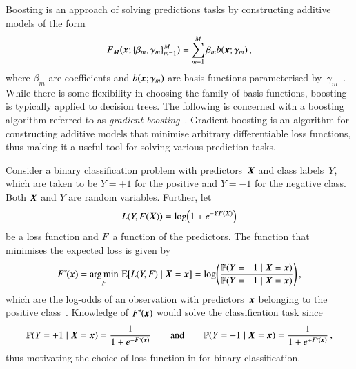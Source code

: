 Boosting is an approach of solving predictions tasks by constructing additive
models of the form
\begin{align*}
  F_{M}\bigl(\myvec{x}; \{ \beta_m, \gamma_{m} \}_{m=1}^{M} \bigr) = \sum_{m = 1}^{M} \beta_m b(\myvec{x}; \gamma_{m}) \,\text{,}
\end{align*}
where $\beta_m$ are coefficients and $b(\myvec{x}; \gamma_{m})$ are basis
functions parameterised
by~$\gamma_{m}$~\cite{Friedman:2000,Friedman:2001wbq}. While there is some
flexibility in choosing the family of basis functions, boosting is typically
applied to decision trees.
The following is concerned with a boosting algorithm referred to as
\emph{gradient boosting}~\cite{Friedman:2001wbq}. Gradient boosting is an
algorithm for constructing additive models that minimise arbitrary
differentiable loss functions, thus making it a useful tool for solving various
prediction tasks.

Consider a binary classification problem with predictors~$\myvec{X}$ and class
labels~$Y$, which are taken to be $Y = +1$ for the positive and $Y = -1$ for the
negative class. Both $\myvec{X}$ and $Y$ are random variables. Further, let
\begin{align}
  L(Y, F(\myvec{X})) = \log\mathopen{}\left(
  1 + e^{-Y F(\myvec{X})}
  \right)\mathclose{}
  \label{eq:loss_gradboost}
\end{align}
be a loss function and $F$~a function of the predictors. The function that
minimises the expected loss is given by
\begin{align}
  F^{*\!}(\myvec{x})
  = \argmin_F \, \expect[ L(Y, F) \mid \myvec{X} = \myvec{x} ]
  = \log\mathopen{}\left(
  \frac{
  \mathbb{P}(Y = +1 \mid \myvec{X} = \myvec{x})
  }{
  \mathbb{P}(Y = -1 \mid \myvec{X} = \myvec{x})
  }
  \right)\mathclose{} \,\text{,}
  \label{eq:gradboost_logodds}
\end{align}
which are the log-odds of an observation with predictors~$\myvec{x}$ belonging
to the positive class~\cite{Friedman:2000}. Knowledge of $F^{*\!}(\myvec{x})$
would solve the classification task since
\begin{align*}
  \mathbb{P}(Y = +1 \mid \myvec{X} = \myvec{x}) = \frac{1}{1 + e^{-F^{*\!}(\myvec{x})}}
  \qquad \text{and} \qquad
  \mathbb{P}(Y = -1 \mid \myvec{X} = \myvec{x}) = \frac{1}{1 + e^{+F^{*\!}(\myvec{x})}} \,\text{,}
\end{align*}
thus motivating the choice of loss function in  for
binary classification.

